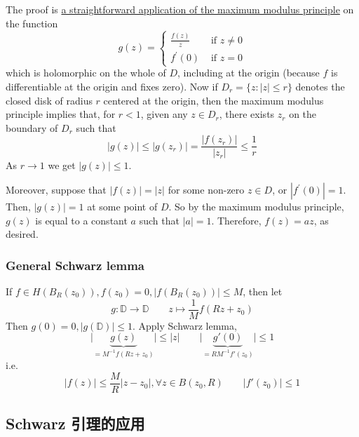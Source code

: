 The proof is \underline{a straightforward application of the maximum modulus principle} on the function
\[
g(z)= \begin{cases}\frac{f(z)}{z} & \text { if } z \neq 0 \\ f^{\prime}(0) & \text { if } z=0\end{cases}
\]
which is holomorphic on the whole of $D$, including at the origin (because $f$ is differentiable at the origin and fixes zero). Now if $D_r=\{z:|z| \leq r\}$ denotes the closed disk of radius $r$ centered at the origin, then the maximum modulus principle implies that, for $r<1$, given any $z \in D_r$, there exists $z_r$ on the boundary of $D_r$ such that
\[
|g(z)| \leq\left|g\left(z_r\right)\right|=\frac{\left|f\left(z_r\right)\right|}{\left|z_r\right|} \leq \frac{1}{r}
\]
As $r \rightarrow 1$ we get $|g(z)| \leq 1$.

Moreover, suppose that $|f(z)|=|z|$ for some non-zero $z \in D$, or $\left|f^{\prime}(0)\right|=1$. Then, $|g(z)|=1$ at some point of $D$. So by the maximum modulus principle, $g(z)$ is equal to a constant $a$ such that $|a|=1$. Therefore, $f(z)=a z$, as desired.

\subsubsection{General Schwarz lemma}

If $f\in H(B_{R}(z_0)),f(z_0)=0,\lvert f(B_{R}(z_0)) \rvert\leq M$, then let
\[
g:\mathbb{D}\to \mathbb{D}\qquad z\mapsto\frac{1}{M}f\left(Rz+z_0 \right)
\]
Then $g(0)=0,\lvert g(\mathbb{D}) \rvert\leq1$. Apply Schwarz lemma,
\[
\lvert \underbrace{ g(z) }_{ =M^{-1}f(Rz+z_0) } \rvert \leq \lvert z \rvert \qquad \lvert \underbrace{ g'(0) }_{ =RM^{-1}f'(z_0) } \rvert \leq 1
\]
i.e.
\[
\lvert f(z) \rvert \leq \frac{M}{R}\lvert z-z_0 \rvert ,\forall z\in B(z_0,R)\qquad \lvert f'(z_0) \rvert \leq 1
\]
\subsection{Schwarz 引理的应用}

